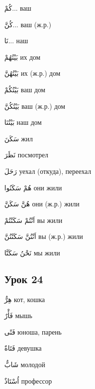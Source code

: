 \documentclass[a5paper]{article}
\newcommand\textstyleDropCaps[1]{#1}
\newcommand\textstyleCaptioncharacters[1]{#1}
\begin{document}
\textstyleCaptioncharacters{كُمْ... }\textstyleDropCaps{ваш‎}

\textstyleCaptioncharacters{كُنَّ... }\textstyleDropCaps{ваш (ж.р.)‎}

\textstyleCaptioncharacters{نَا... }\textstyleDropCaps{наш‎}

\textstyleCaptioncharacters{بَيْتُهُمْ }\textstyleDropCaps{их дом‎}

\textstyleCaptioncharacters{بَيْتُهُنَّ }\textstyleDropCaps{их (ж.р.) дом‎}

\textstyleCaptioncharacters{بَيْتُكُمْ }\textstyleDropCaps{ваш дом‎}

\textstyleCaptioncharacters{بَيْتُكُنَّ }\textstyleDropCaps{ваш (ж.р.) дом‎}

\textstyleCaptioncharacters{بَيْتُنَا }\textstyleDropCaps{наш дом‎}

\textstyleCaptioncharacters{سَكَنَ }\textstyleDropCaps{жил‎}

\textstyleCaptioncharacters{نَظَرَ }\textstyleDropCaps{посмотрел‎}

\textstyleCaptioncharacters{رَحَلَ }\textstyleDropCaps{уехал (откуда), переехал‎}

\textstyleCaptioncharacters{هُمْ سَكَنُوا }\textstyleDropCaps{они жили‎}

\textstyleCaptioncharacters{هُنَّ سَكَنَّ }\textstyleDropCaps{они (ж.р.) жили‎}

\textstyleCaptioncharacters{اَنْتُمْ سَكَنْتُمْ }\textstyleDropCaps{вы жили‎}

\textstyleCaptioncharacters{اَنْتُنَّ سَكَنْتُنَّ }\textstyleDropCaps{вы (ж.р.) жили‎}

\textstyleCaptioncharacters{نَحْنُ سَكَنَّا }\textstyleDropCaps{мы жили‎}

\subsection[Урок 24‎]{\textstyleDropCaps{Урок 24‎}}
\textstyleCaptioncharacters{هِرٌّ }\textstyleDropCaps{кот, кошка‎}

\textstyleCaptioncharacters{فَأْرٌ }\textstyleDropCaps{мышь‎}

\textstyleCaptioncharacters{فَتًى }\textstyleDropCaps{юноша, парень‎}

\textstyleCaptioncharacters{فَتَاةٌ }\textstyleDropCaps{девушка‎}

\textstyleCaptioncharacters{شَابٌّ }\textstyleDropCaps{молодой‎}

\textstyleCaptioncharacters{اُسْتَاذٌ }\textstyleDropCaps{профессор‎}
\end{document}
